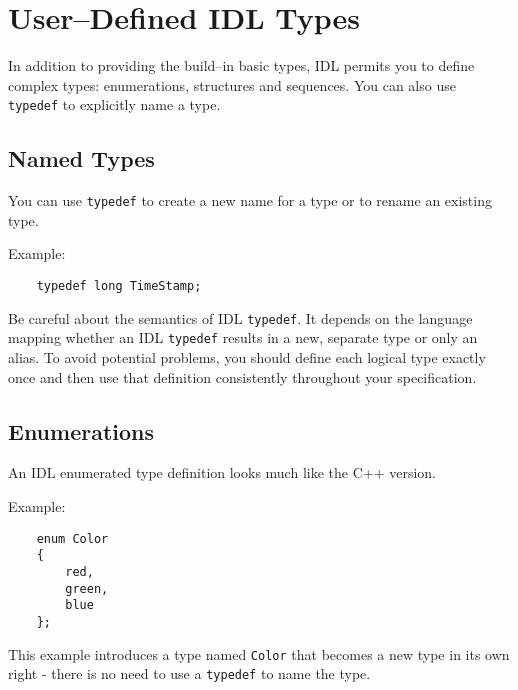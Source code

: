\section{User--Defined IDL Types}
In addition to providing the build--in basic types, IDL permits you to define
complex types: enumerations, structures and sequences. You can also use {\tt 
typedef} to explicitly name a type.

\subsection{Named Types}

You can use {\tt typedef} to create a new name for a type or to rename an
existing type.

Example:
\begin{verbatim}
    typedef long TimeStamp;
\end{verbatim}

Be careful about the semantics of IDL {\tt typedef}. It depends on the language
mapping whether an IDL {\tt typedef} results in a new, separate type or only an
alias. 
To avoid potential problems, you should define each logical type exactly once
and then use that definition consistently throughout your specification.


\subsection{Enumerations}
An IDL enumerated type definition looks much like the C++ version.

Example:
\begin{verbatim}
    enum Color 
    {
        red, 
        green, 
        blue
    };
\end{verbatim}

This example introduces a type named {\tt Color} that becomes a new type in its
own right - there is no need to use a {\tt typedef} to name the type.


